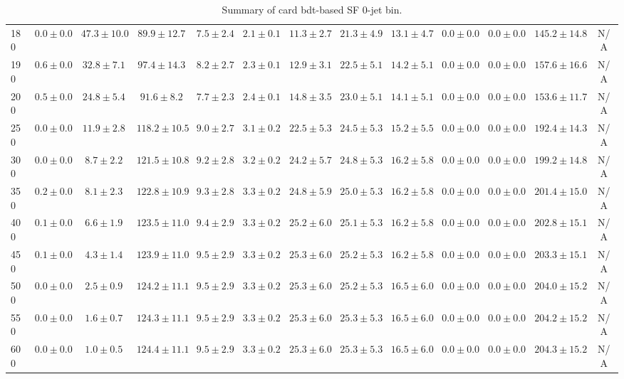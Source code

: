 \begin{table}
{\begin{center}
\begin{tabular}{l | c c | c c c c c c c c  | c c}
180 & $0.0\pm0.0$ & $47.3\pm10.0$ & $89.9\pm12.7$ & $7.5\pm2.4$ & $2.1\pm0.1$ & $11.3\pm2.7$ & $21.3\pm4.9$ & $13.1\pm4.7$ & $0.0\pm0.0$ & $0.0\pm0.0$ & $145.2\pm14.8$ & N/A \\
190 & $0.6\pm0.0$ & $32.8\pm7.1$ & $97.4\pm14.3$ & $8.2\pm2.7$ & $2.3\pm0.1$ & $12.9\pm3.1$ & $22.5\pm5.1$ & $14.2\pm5.1$ & $0.0\pm0.0$ & $0.0\pm0.0$ & $157.6\pm16.6$ & N/A \\
200 & $0.5\pm0.0$ & $24.8\pm5.4$ & $91.6\pm8.2$ & $7.7\pm2.3$ & $2.4\pm0.1$ & $14.8\pm3.5$ & $23.0\pm5.1$ & $14.1\pm5.1$ & $0.0\pm0.0$ & $0.0\pm0.0$ & $153.6\pm11.7$ & N/A \\
250 & $0.0\pm0.0$ & $11.9\pm2.8$ & $118.2\pm10.5$ & $9.0\pm2.7$ & $3.1\pm0.2$ & $22.5\pm5.3$ & $24.5\pm5.3$ & $15.2\pm5.5$ & $0.0\pm0.0$ & $0.0\pm0.0$ & $192.4\pm14.3$ & N/A \\
300 & $0.0\pm0.0$ & $8.7\pm2.2$ & $121.5\pm10.8$ & $9.2\pm2.8$ & $3.2\pm0.2$ & $24.2\pm5.7$ & $24.8\pm5.3$ & $16.2\pm5.8$ & $0.0\pm0.0$ & $0.0\pm0.0$ & $199.2\pm14.8$ & N/A \\
350 & $0.2\pm0.0$ & $8.1\pm2.3$ & $122.8\pm10.9$ & $9.3\pm2.8$ & $3.3\pm0.2$ & $24.8\pm5.9$ & $25.0\pm5.3$ & $16.2\pm5.8$ & $0.0\pm0.0$ & $0.0\pm0.0$ & $201.4\pm15.0$ & N/A \\
400 & $0.1\pm0.0$ & $6.6\pm1.9$ & $123.5\pm11.0$ & $9.4\pm2.9$ & $3.3\pm0.2$ & $25.2\pm6.0$ & $25.1\pm5.3$ & $16.2\pm5.8$ & $0.0\pm0.0$ & $0.0\pm0.0$ & $202.8\pm15.1$ & N/A \\
450 & $0.1\pm0.0$ & $4.3\pm1.4$ & $123.9\pm11.0$ & $9.5\pm2.9$ & $3.3\pm0.2$ & $25.3\pm6.0$ & $25.2\pm5.3$ & $16.2\pm5.8$ & $0.0\pm0.0$ & $0.0\pm0.0$ & $203.3\pm15.1$ & N/A \\
500 & $0.0\pm0.0$ & $2.5\pm0.9$ & $124.2\pm11.1$ & $9.5\pm2.9$ & $3.3\pm0.2$ & $25.3\pm6.0$ & $25.2\pm5.3$ & $16.5\pm6.0$ & $0.0\pm0.0$ & $0.0\pm0.0$ & $204.0\pm15.2$ & N/A \\
550 & $0.0\pm0.0$ & $1.6\pm0.7$ & $124.3\pm11.1$ & $9.5\pm2.9$ & $3.3\pm0.2$ & $25.3\pm6.0$ & $25.3\pm5.3$ & $16.5\pm6.0$ & $0.0\pm0.0$ & $0.0\pm0.0$ & $204.2\pm15.2$ & N/A \\
600 & $0.0\pm0.0$ & $1.0\pm0.5$ & $124.4\pm11.1$ & $9.5\pm2.9$ & $3.3\pm0.2$ & $25.3\pm6.0$ & $25.3\pm5.3$ & $16.5\pm6.0$ & $0.0\pm0.0$ & $0.0\pm0.0$ & $204.3\pm15.2$ & N/A \\
\hline
\end{tabular}
\end{center}
}
\caption{Summary of card bdt-based SF 0-jet bin.}
\end{table}
